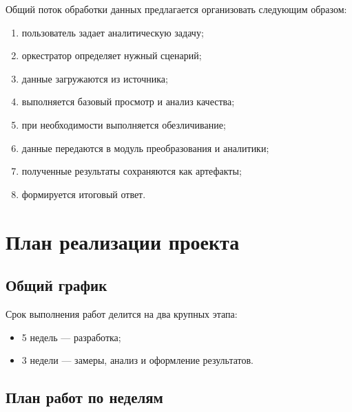 \documentclass[14pt,a4paper]{extarticle}
\begin{document}
Общий поток обработки данных предлагается организовать следующим образом:
\begin{enumerate}
    \item пользователь задает аналитическую задачу;
    \item оркестратор определяет нужный сценарий;
    \item данные загружаются из источника;
    \item выполняется базовый просмотр и анализ качества;
    \item при необходимости выполняется обезличивание;
    \item данные передаются в модуль преобразования и аналитики;
    \item полученные результаты сохраняются как артефакты;
    \item формируется итоговый ответ.
\end{enumerate}

\section{План реализации проекта}

\subsection{Общий график}

Срок выполнения работ делится на два крупных этапа:
\begin{itemize}
    \item 5 недель --- разработка;
    \item 3 недели --- замеры, анализ и оформление результатов.
\end{itemize}

\subsection{План работ по неделям}
\end{document}
